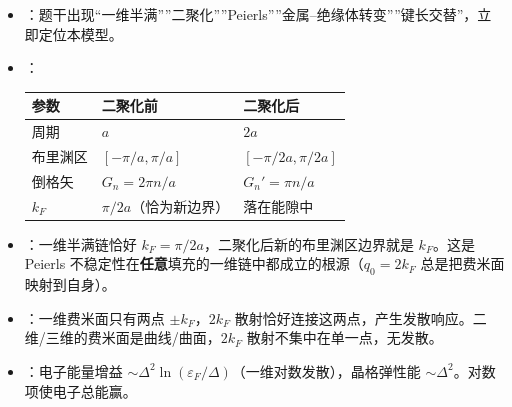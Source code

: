 \begin{tipbox}[快速识别与解题技巧]
\begin{itemize}
    \item {}：题干出现``一维半满''''二聚化''''Peierls''''金属--绝缘体转变''''键长交替''，立即定位本模型。
    \item {}：
    \begin{center}
    \begin{tabular}{lll}
    \toprule
    \textbf{参数} & \textbf{二聚化前} & \textbf{二聚化后} \\
    \midrule
    周期 & $a$ & $2a$ \\
    布里渊区 & $[-\pi/a,\pi/a]$ & $[-\pi/2a,\pi/2a]$ \\
    倒格矢 & $G_n=2\pi n/a$ & $G_n'=\pi n/a$ \\
    $k_F$ & $\pi/2a$（恰为新边界） & 落在能隙中 \\
    \bottomrule
    \end{tabular}
    \end{center}
    \item {}：一维半满链恰好 $k_F=\pi/2a$，二聚化后新的布里渊区边界就是 $k_F$。这是 Peierls 不稳定性在\textbf{任意}填充的一维链中都成立的根源（$q_0=2k_F$ 总是把费米面映射到自身）。
    \item {}：一维费米面只有两点 $\pm k_F$，$2k_F$ 散射恰好连接这两点，产生发散响应。二维/三维的费米面是曲线/曲面，$2k_F$ 散射不集中在单一点，无发散。
    \item {}：电子能量增益 $\sim\Delta^2\ln(\varepsilon_F/\Delta)$（一维对数发散），晶格弹性能 $\sim\Delta^2$。对数项使电子总能赢。
\end{itemize}
\end{tipbox}

